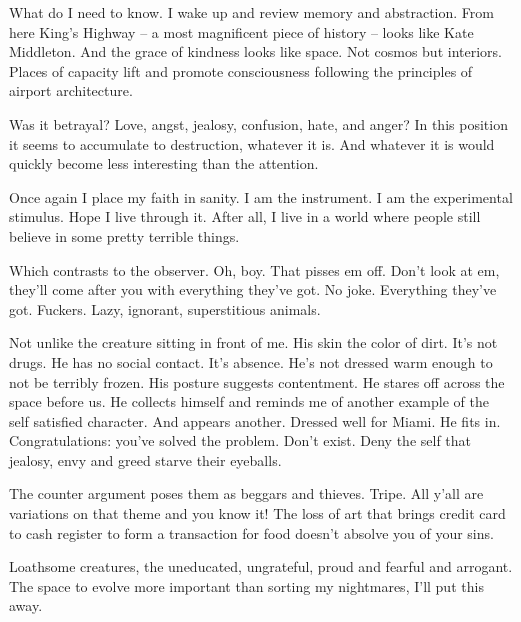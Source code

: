 

What do I need to know.  I wake up and review memory and abstraction.
From here King's Highway -- a most magnificent piece of history --
looks like Kate Middleton.  And the grace of kindness looks like
space.  Not cosmos but interiors.  Places of capacity lift and promote
consciousness following the principles of airport architecture.

Was it betrayal?  Love, angst, jealosy, confusion, hate, and anger?
In this position it seems to accumulate to destruction, whatever it
is.  And whatever it is would quickly become less interesting than the
attention.  

Once again I place my faith in sanity.  I am the instrument.  I am the
experimental stimulus.  Hope I live through it.  After all, I live in
a world where people still believe in some pretty terrible things.

Which contrasts to the observer.  Oh, boy.  That pisses em off.  Don't
look at em, they'll come after you with everything they've got.  No
joke.  Everything they've got.  Fuckers.  Lazy, ignorant,
superstitious animals.

Not unlike the creature sitting in front of me.  His skin the color of
dirt.  It's not drugs.  He has no social contact.  It's absence.  He's
not dressed warm enough to not be terribly frozen.  His posture
suggests contentment.  He stares off across the space before us.  He
collects himself and reminds me of another example of the self
satisfied character.  And appears another.  Dressed well for Miami.
He fits in.  Congratulations: you've solved the problem.  Don't exist.
Deny the self that jealosy, envy and greed starve their eyeballs.

The counter argument poses them as beggars and thieves.  Tripe.  All
y'all are variations on that theme and you know it!  The loss of art
that brings credit card to cash register to form a transaction for
food doesn't absolve you of your sins.  

Loathsome creatures, the uneducated, ungrateful, proud and fearful and
arrogant.  The space to evolve more important than sorting my
nightmares, I'll put this away.

\bye
